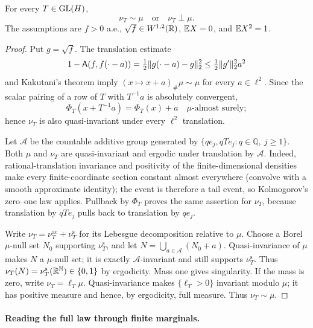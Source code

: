 \begin{lemma}
\label{lem:equivalence-singularity-dichotomy}
For every \(T\in\operatorname{GL}(H)\),
\begin{equation}
  \nu_T\sim\mu\quad\text{or}\quad\nu_T\perp\mu.
\end{equation}
The assumptions are \(f>0\) a.e., \(\sqrt f\in W^{1,2}(\mathbb R)\),
\(\mathbb E X=0\), and \(\mathbb E X^2=1\).
\end{lemma}

\begin{proof}
Put \(g=\sqrt f\).  The translation estimate
\[
  1-\mathsf A(f,f(\cdot-a))
     =\tfrac12\|g(\cdot-a)-g\|_2^2
     \leq\tfrac12\|g'\|_2^2a^2
\]
and Kakutani's theorem imply
\((x\mapsto x+a)_\#\mu\sim\mu\) for every \(a\in\ell^2\).
Since the scalar pairing of a row of \(T\) with \(T^{-1}a\) is absolutely
convergent,
\[
  \Phi_T(x+T^{-1}a)=\Phi_T(x)+a
  \quad\mu\text{-almost surely};
\]
hence \(\nu_T\) is also quasi-invariant under every \(\ell^2\) translation.

Let \(\mathcal A\) be the countable additive group generated by
\(\{qe_j,qTe_j:q\in\mathbb Q,\ j\geq1\}\).
Both \(\mu\) and \(\nu_T\) are quasi-invariant and ergodic under
translation by \(\mathcal A\).  Indeed, rational-translation invariance and
positivity of the finite-dimensional densities make every finite-coordinate
section constant almost everywhere (convolve with a smooth approximate
identity); the event is therefore a tail event, so Kolmogorov's zero--one law
applies.  Pullback by \(\Phi_T\) proves the same assertion for \(\nu_T\),
because translation by \(qTe_j\) pulls back to translation by \(qe_j\).

Write \(\nu_T=\nu_T^{\mathrm{ac}}+\nu_T^{\mathrm{s}}\) for its Lebesgue decomposition relative to
\(\mu\).  Choose a Borel \(\mu\)-null set \(N_0\) supporting
\(\nu_T^{\mathrm{s}}\), and let \(N=\bigcup_{a\in\mathcal A}(N_0+a)\).
Quasi-invariance of \(\mu\) makes \(N\) a \(\mu\)-null set;
it is exactly \(\mathcal A\)-invariant and still supports \(\nu_T^{\mathrm{s}}\).
Thus \(\nu_T(N)=\nu_T^{\mathrm{s}}(\mathbb R^{\mathbb N})\in\{0,1\}\) by ergodicity.  Mass one gives
singularity.  If the mass is zero, write \(\nu_T=\ell_T\mu\).
Quasi-invariance makes \(\{\ell_T>0\}\) invariant modulo \(\mu\); it has
positive measure and hence, by ergodicity, full measure.  Thus
\(\nu_T\sim\mu\).
\end{proof}

\paragraph{Reading the full law through finite marginals.}

